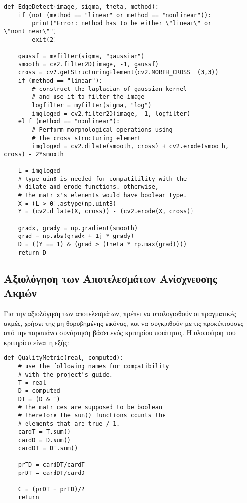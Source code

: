 \documentclass{article}
\begin{document}
\begin{lstlisting}[breaklines=true, showstringspaces=false]
def EdgeDetect(image, sigma, theta, method):
    if (not (method == "linear" or method == "nonlinear")):
        print("Error: method has to be either \"linear\" or \"nonlinear\"")
        exit(2)
    
    gaussf = myfilter(sigma, "gaussian")
    smooth = cv2.filter2D(image, -1, gaussf)
    cross = cv2.getStructuringElement(cv2.MORPH_CROSS, (3,3))
    if (method == "linear"):
        # construct the laplacian of gaussian kernel
        # and use it to filter the image
        logfilter = myfilter(sigma, "log")
        imgloged = cv2.filter2D(image, -1, logfilter)
    elif (method == "nonlinear"):
        # Perform morphological operations using
        # the cross structuring element
        imgloged = cv2.dilate(smooth, cross) + cv2.erode(smooth, cross) - 2*smooth
    
    L = imgloged
    # type uin8 is needed for compatibility with the
    # dilate and erode functions. otherwise,
    # the matrix's elements would have boolean type.
    X = (L > 0).astype(np.uint8)
    Y = (cv2.dilate(X, cross)) - (cv2.erode(X, cross))

    gradx, grady = np.gradient(smooth)
    grad = np.abs(gradx + 1j * grady)
    D = ((Y == 1) & (grad > (theta * np.max(grad))))
    return D
\end{lstlisting}

\subsection{Αξιολόγηση των Αποτελεσμάτων Ανίσχνευσης Ακμών}

Για την αξιολόγηση των αποτελεσμάτων, πρέπει να υπολογισθούν οι πραγματικές ακμές, χρήσει της μη θορυβημένης εικόνας, και να συγκριθούν με τις προκύπτουσες από την παραπάνω συνάρτηση βάσει ενός κριτηρίου ποιότητας. Η υλοποίηση του κριτηρίου είναι η εξής:

\begin{lstlisting}[breaklines=true, showstringspaces=false]
def QualityMetric(real, computed):
    # use the following names for compatibility
    # with the project's guide.
    T = real
    D = computed
    DT = (D & T)
    # the matrices are supposed to be boolean
    # therefore the sum() functions counts the
    # elements that are true / 1.
    cardT = T.sum()
    cardD = D.sum()
    cardDT = DT.sum()

    prTD = cardDT/cardT
    prDT = cardDT/cardD

    C = (prDT + prTD)/2
    return 
\end{lstlisting}
\end{document}
